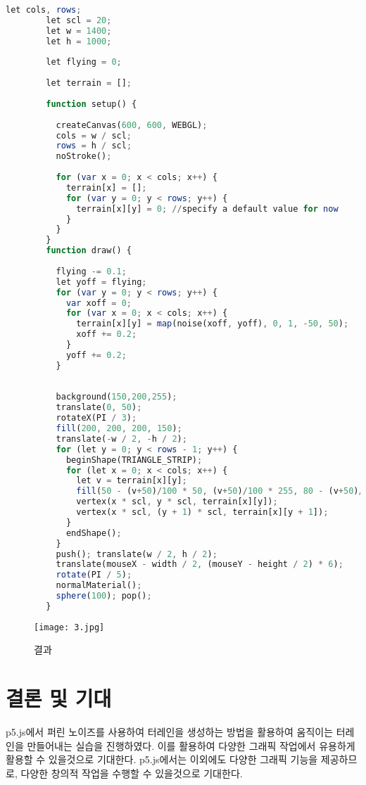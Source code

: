 \documentclass{article}
\begin{document}
    \begin{lstlisting}[language=Octave]
        let cols, rows;
        let scl = 20;
        let w = 1400;
        let h = 1000;
        
        let flying = 0;
        
        let terrain = [];
        
        function setup() {
          
          createCanvas(600, 600, WEBGL);
          cols = w / scl;
          rows = h / scl;
          noStroke();
        
          for (var x = 0; x < cols; x++) {
            terrain[x] = [];
            for (var y = 0; y < rows; y++) {
              terrain[x][y] = 0; //specify a default value for now
            }
          }
        }
        function draw() {
          
          flying -= 0.1;
          let yoff = flying;
          for (var y = 0; y < rows; y++) {
            var xoff = 0;
            for (var x = 0; x < cols; x++) {
              terrain[x][y] = map(noise(xoff, yoff), 0, 1, -50, 50);
              xoff += 0.2;
            }
            yoff += 0.2;
          }
        
        
          background(150,200,255);
          translate(0, 50);
          rotateX(PI / 3);
          fill(200, 200, 200, 150);
          translate(-w / 2, -h / 2);
          for (let y = 0; y < rows - 1; y++) {
            beginShape(TRIANGLE_STRIP);
            for (let x = 0; x < cols; x++) {
              let v = terrain[x][y];
              fill(50 - (v+50)/100 * 50, (v+50)/100 * 255, 80 - (v+50)/100 * 80)
              vertex(x * scl, y * scl, terrain[x][y]);
              vertex(x * scl, (y + 1) * scl, terrain[x][y + 1]);
            }
            endShape();
          }
          push(); translate(w / 2, h / 2);
          translate(mouseX - width / 2, (mouseY - height / 2) * 6);
          rotate(PI / 5);
          normalMaterial();
          sphere(100); pop();
        }
    \end{lstlisting}
    \begin{figure}[htbp]
        \centering
        \texttt{[image: 3.jpg]}
        \caption{결과}
        \label{fig:result}
    \end{figure}
    
\section{결론 및 기대}
p5.js에서 퍼린 노이즈를 사용하여 터레인을 생성하는 방법을 활용하여 움직이는 터레인을 만들어내는 실습을 진행하였다. 이를 활용하여 다양한 그래픽 작업에서 유용하게 활용할 수 있을것으로 기대한다. p5.js에서는 이외에도 다양한 그래픽 기능을 제공하므로, 다양한 창의적 작업을 수행할 수 있을것으로 기대한다.
\end{document}
